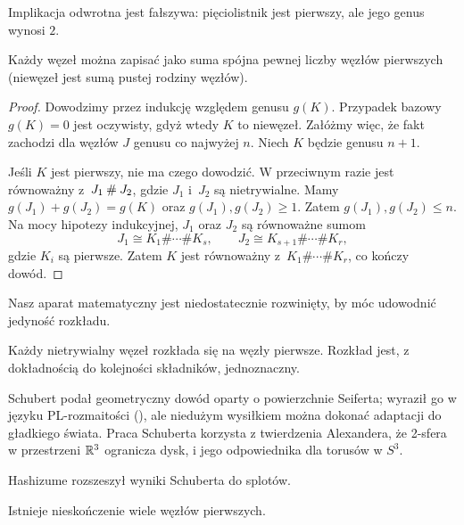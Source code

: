 Implikacja odwrotna jest fałszywa: pięciolistnik jest pierwszy, ale jego genus wynosi $2$.

\begin{proposition}
    Każdy węzeł można zapisać jako suma spójna pewnej liczby węzłów pierwszych (niewęzeł jest sumą pustej rodziny węzłów).
\end{proposition}

\begin{proof}
    Dowodzimy przez indukcję względem genusu $g(K)$.
    Przypadek bazowy $g(K) = 0$ jest oczywisty, gdyż wtedy $K$ to niewęzeł.
    Załóżmy więc, że fakt zachodzi dla węzłów $J$ genusu co najwyżej $n$.
    Niech $K$ będzie genusu $n + 1$.

    Jeśli $K$ jest pierwszy, nie ma czego dowodzić.
    W przeciwnym razie jest równoważny z~$J_1 \mathbin{\#} J_2$, gdzie $J_1$ i~$J_2$ są nietrywialne.
    Mamy $g(J_1) + g(J_2) = g(K)$ oraz $g(J_1),g(J_2) \ge 1$.
    Zatem $g(J_1), g(J_2) \le n$.
    Na mocy hipotezy indukcyjnej, $J_1$ oraz $J_2$ są równoważne sumom
    \[
        J_1 \cong K_1\#\cdots\# K_s,\qquad
        J_2 \cong K_{s+1}\#\cdots\# K_r,
    \]
    gdzie $K_i$ są pierwsze.
    Zatem $K$ jest równoważny z~$K_1\#\cdots\# K_r$, co kończy dowód.
\end{proof}

Nasz aparat matematyczny jest niedostatecznie rozwinięty, by móc udowodnić jedyność rozkładu.

\begin{theorem}[Schubert, 1949]
	Każdy nietrywialny węzeł rozkłada się na węzły pierwsze.
	Rozkład jest, z dokładnością do kolejności składników, jednoznaczny.
%
\end{theorem}

Schubert podał geometryczny dowód oparty o powierzchnie Seiferta; wyraził go w języku PL-rozmaitości (\cite{schubert49}), ale niedużym wysiłkiem można dokonać adaptacji do gładkiego świata.
Praca Schuberta korzysta z twierdzenia Alexandera, że 2-sfera w przestrzeni $\mathbb R^3$ ogranicza dysk, i jego odpowiednika dla torusów w $S^3$.

Hashizume \cite{hashizume58} rozszeszył wyniki Schuberta do splotów.

\begin{proposition}
    \label{prp:infinitely_many_prime_knots}
    Istnieje nieskończenie wiele węzłów pierwszych.
\end{proposition}

